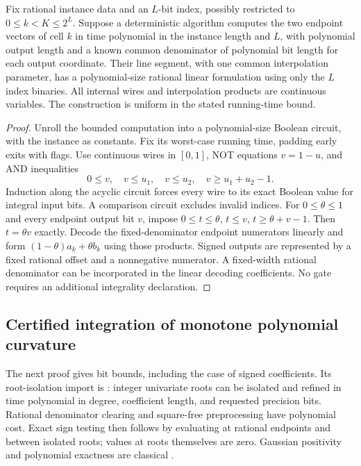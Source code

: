 \begin{lemma}\label{lem:indexed-compiler}
Fix rational instance data and an $L$-bit index, possibly restricted to
$0\le k<K\le2^L$. Suppose a deterministic algorithm computes the two
endpoint vectors of cell $k$ in time polynomial in the instance length
and $L$, with polynomial output length and a known common denominator
of polynomial bit length for each output coordinate. Their line segment, with one common
interpolation parameter, has a polynomial-size rational linear
formulation using only the $L$ index binaries. All internal wires and
interpolation products are continuous variables. The construction is
uniform in the stated running-time bound.
\end{lemma}
\begin{proof}
Unroll the bounded computation into a polynomial-size Boolean circuit,
with the instance as constants. Fix its worst-case running time, padding
early exits with flags. Use continuous wires in $[0,1]$, NOT equations
$v=1-u$, and AND inequalities
\[
 0\le v,\quad v\le u_1,\quad v\le u_2,\quad v\ge u_1+u_2-1.
\]
Induction along the acyclic circuit forces every wire to its exact
Boolean value for integral input bits. A comparison circuit excludes
invalid indices. For $0\le\theta\le1$ and every endpoint output bit
$v$, impose $0\le t\le\theta$, $t\le v$, $t\ge\theta+v-1$.
Then $t=\theta v$ exactly. Decode the fixed-denominator endpoint
numerators linearly and form $(1-\theta)a_k+\theta b_k$ using those
products. Signed outputs are represented by a fixed rational offset
and a nonnegative numerator. A fixed-width rational denominator can
be incorporated in the linear decoding coefficients. No gate requires
an additional integrality declaration.
\end{proof}

\subsection{Certified integration of monotone polynomial curvature}

The next proof gives bit bounds, including the case of signed
coefficients. Its root-isolation import is
\citet[Theorem 36]{sagraloff2015}: integer univariate roots can be
isolated and refined in time polynomial in degree, coefficient length,
and requested precision bits. Rational denominator clearing and
square-free preprocessing have polynomial cost. Exact sign testing
then follows by evaluating at rational endpoints and between isolated
roots; values at roots themselves are zero. Gaussian positivity and
polynomial exactness are classical \citep[Section 3.5(v)]{dlmfquadrature}.

